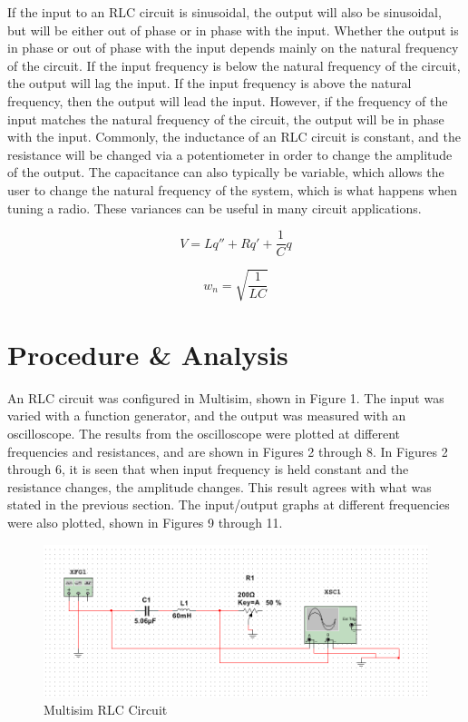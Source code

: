 \documentclass[12pt]{article}
\begin{document}
If the input to an RLC circuit is sinusoidal, the output will also be sinusoidal, but will be either out of phase or in phase with the input. Whether the output is in phase or out of phase with the input depends mainly on the natural frequency of the circuit. If the input frequency is below the natural frequency of the circuit, the output will lag the input. If the input frequency is above the natural frequency, then the output will lead the input. However, if the frequency of the input matches the natural frequency of the circuit, the output will be in phase with the input. Commonly, the inductance of an RLC circuit is constant, and the resistance will be changed via a potentiometer in order to change the amplitude of the output. The capacitance can also typically be variable, which allows the user to change the natural frequency of the system, which is what happens when tuning a radio. These variances can be useful in many circuit applications.
\bigskip
 
 \begin{equation}
V = Lq'' + Rq' + \frac{1}{C}q
 \end{equation}
 \bigskip

\begin{equation}
w_{n} = \sqrt{\frac{1}{LC}}
\end{equation}

\newpage


\section*{\fontsize{12}{12}\selectfont \large Procedure \& Analysis}
An RLC circuit was configured in Multisim, shown in Figure 1. The input was varied with a function generator, and the output was measured with an oscilloscope. The results from the oscilloscope were plotted at different frequencies and resistances, and are shown in Figures 2 through 8. In Figures 2 through 6, it is seen that when input frequency is held constant and the resistance changes, the amplitude changes. This result agrees with what was stated in the previous section. The input/output graphs at different frequencies were also plotted, shown in Figures 9 through 11.
\bigskip

\begin{figure}[h!] %
   \centering
   \includegraphics[width=5.5in]{Oscilloscope_Circuit.PNG} 
   \caption{Multisim RLC Circuit}
   \label{fig:example}
\end{figure}
\bigskip
\end{document}
